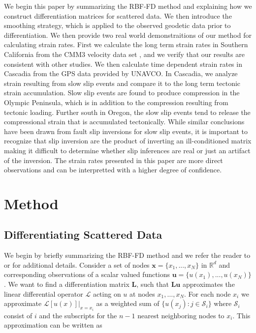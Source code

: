 \documentclass[10pt,a4paper]{article}
\begin{document}
We begin this paper by summarizing the RBF-FD method and explaining how we construct differentiation matrices for scattered data. We then introduce the smoothing strategy, which is applied to the observed geodetic data prior to differentiation.  We then provide two real world demonstraitions of our method for calculating strain rates.  First we calculate the long term strain rates in Southern California from the CMM3 velocity data set \citep{Shen2011}, and we verify that our results are consistent with other studies. We then calculate time dependent strain rates in Cascadia from the GPS data provided by UNAVCO.  In Cascadia, we analyze strain resulting from slow slip events and compare it to the long term tectonic strain accumulation. Slow slip events are found to produce compression in the Olympic Peninsula, which is in addition to the compression resulting from tectonic loading.  Further south in Oregon, the slow slip events tend to release the compressional strain that is accumulated tectonically.  While similar conclusions have been drawn from fault slip inversions for slow slip events, it is important to recognize that slip inversion are the product of inverting an ill-conditioned matrix making it difficult to determine whether slip inferences are real or just an artifact of the inversion.  The strain rates presented in this paper are more direct observations and can be interpretted with a higher degree of confidence. 

\section{Method}
\subsection{Differentiating Scattered Data}

We begin by briefly summarizing the RBF-FD method and we refer the reader to \citet{Wright2006} or \citet{Fornberg2015} for additional details. Consider a set of nodes $\mathbf{x} = \{x_1, ..., x_N\}$ in $\mathbb{R}^d$ and corresponding observations of a scalar valued functions $\mathbf{u} = \{u(x_1), ..., u(x_N)\}$.  We want to find a differentiation matrix $\mathbf{L}$, such that $\mathbf{Lu}$ approximates the linear differential operator $\mathcal{L}$ acting on $u$ at nodes $x_1, \dots, x_N$.  For each node $x_i$ we approximate $\mathcal{L}[u(x)]\big|_{x=x_i}$ as a weighted sum of $\{u(x_j): j \in \mathcal{S}_i\}$ where $\mathcal{S}_i$ consist of $i$ and the subscripts for the $n-1$ nearest neighboring nodes to $x_i$. This approximation can be written as
\end{document}
